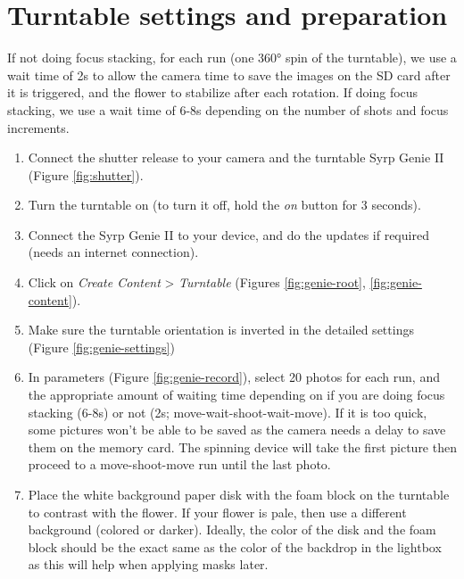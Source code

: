 \documentclass[
]{book}
\begin{document}
\hypertarget{turntable-settings-and-preparation}{%
\section{Turntable settings and preparation}\label{turntable-settings-and-preparation}}

If not doing focus stacking, for each run (one 360° spin of the turntable), we use a wait time of 2s
to allow the camera time to save the images on the SD card after it is triggered, and the flower to stabilize after each rotation. If doing focus stacking, we use a wait time of 6-8s depending on the number of shots and focus increments.

\begin{enumerate}
\def\labelenumi{\arabic{enumi}.}
\item
  Connect the shutter release to your camera and the turntable Syrp
  Genie II (Figure \ref{fig:shutter}).
\item
  Turn the turntable on (to turn it off, hold the \emph{on} button for 3
  seconds).
\item
  Connect the Syrp Genie II to your device, and do the updates if
  required (needs an internet connection).
\item
  Click on \emph{Create Content} \textgreater{} \emph{Turntable} (Figures
  \ref{fig:genie-root}, \ref{fig:genie-content}).
\item
  Make sure the turntable orientation is inverted in the detailed settings
  (Figure \ref{fig:genie-settings})
\item
  In parameters (Figure \ref{fig:genie-record}), select 20 photos for
  each run, and the appropriate amount of waiting time depending on if you are doing focus stacking (6-8s)
  or not (2s; move-wait-shoot-wait-move). If it is too quick, some
  pictures won't be able to be saved as the camera needs a delay to
  save them on the memory card. The spinning device will take the
  first picture then proceed to a move-shoot-move run until the last
  photo.
\item
  Place the white background paper disk with the foam block on the turntable to contrast with
  the flower. If your flower is pale, then use a different background
  (colored or darker). Ideally, the color of the disk and the foam block should be the
  exact same as the color of the backdrop in the lightbox as this will help
  when applying masks later.
\end{enumerate}
\end{document}
